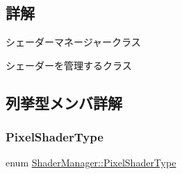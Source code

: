 \subsection{詳解}
シェーダーマネージャークラス 

シェーダーを管理するクラス 

\subsection{列挙型メンバ詳解}
\mbox{\label{class_shader_manager_a7d15d773b3c6a99dd7086c45c8b0be5f}} 
\subsubsection{\texorpdfstring{Pixel\+Shader\+Type}{PixelShaderType}}
{\footnotesize\ttfamily enum \mbox{\hyperlink{class_shader_manager_a7d15d773b3c6a99dd7086c45c8b0be5f}{Shader\+Manager\+::\+Pixel\+Shader\+Type}}}

